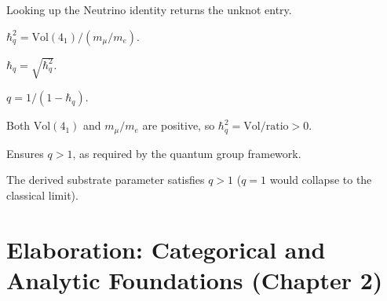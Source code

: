 \begin{theorem}
  \label{thm:neutrino-is-unknot}
  \leanok
  Looking up the Neutrino identity returns the unknot entry.
\end{theorem}

\begin{definition}
  \label{def:h-q-squared}
  \leanok
  $\hbar_q^2 = \mathrm{Vol}(4_1) / (m_\mu/m_e)$.
\end{definition}

\begin{definition}
  \label{def:h-q-value}
  \leanok
  $\hbar_q = \sqrt{\hbar_q^2}$.
\end{definition}

\begin{definition}[$q$ (derived)]
  \label{def:derived-q}
  \leanok
  $q = 1 / (1 - \hbar_q)$.
\end{definition}

\begin{lemma}[$\hbar_q^2 > 0$]
  \label{lem:hq-squared-pos}
  Both $\mathrm{Vol}(4_1)$ and $m_\mu/m_e$ are positive,
  so $\hbar_q^2 = \mathrm{Vol}/\mathrm{ratio} > 0$.
\end{lemma}

\begin{lemma}[$\hbar_q \in (0,1)$]
  \label{lem:hq-unit-interval}
  Ensures $q > 1$, as required by the quantum group framework.
\end{lemma}

\begin{lemma}[$q > 1$]
  \label{lem:derived-q-gt-one}
  The derived substrate parameter satisfies $q > 1$
  ($q = 1$ would collapse to the classical limit).
\end{lemma}


\chapter{Elaboration: Categorical and Analytic Foundations (Chapter 2)}


